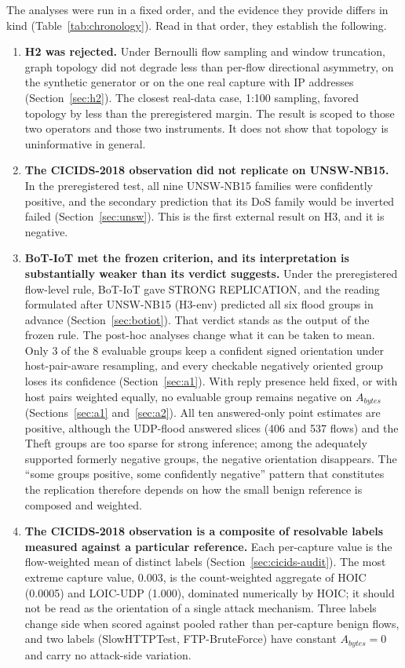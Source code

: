 \documentclass[preprint,12pt]{elsarticle}
\begin{document}
The analyses were run in a fixed order, and the evidence they provide differs in kind (Table~\ref{tab:chronology}). Read in that order, they establish the following.

\begin{enumerate}
\item \textbf{H2 was rejected.} Under Bernoulli flow sampling and window truncation, graph topology did not degrade less than per-flow directional asymmetry, on the synthetic generator or on the one real capture with IP addresses (Section~\ref{sec:h2}). The closest real-data case, 1:100 sampling, favored topology by less than the preregistered margin. The result is scoped to those two operators and those two instruments. It does not show that topology is uninformative in general.
\item \textbf{The CICIDS-2018 observation did not replicate on UNSW-NB15.} In the preregistered test, all nine UNSW-NB15 families were confidently positive, and the secondary prediction that its DoS family would be inverted failed (Section~\ref{sec:unsw}). This is the first external result on H3, and it is negative.
\item \textbf{BoT-IoT met the frozen criterion, and its interpretation is substantially weaker than its verdict suggests.} Under the preregistered flow-level rule, BoT-IoT gave STRONG REPLICATION, and the reading formulated after UNSW-NB15 (H3-env) predicted all six flood groups in advance (Section~\ref{sec:botiot}). That verdict stands as the output of the frozen rule. The post-hoc analyses change what it can be taken to mean. Only 3 of the 8 evaluable groups keep a confident signed orientation under host-pair-aware resampling, and every checkable negatively oriented group loses its confidence (Section~\ref{sec:a1}). With reply presence held fixed, or with host pairs weighted equally, no evaluable group remains negative on $A_{bytes}$ (Sections~\ref{sec:a1} and~\ref{sec:a2}). All ten answered-only point estimates are positive, although the UDP-flood answered slices (406 and 537 flows) and the Theft groups are too sparse for strong inference; among the adequately supported formerly negative groups, the negative orientation disappears. The ``some groups positive, some confidently negative'' pattern that constitutes the replication therefore depends on how the small benign reference is composed and weighted.
\item \textbf{The CICIDS-2018 observation is a composite of resolvable labels measured against a particular reference.} Each per-capture value is the flow-weighted mean of distinct labels (Section~\ref{sec:cicids-audit}). The most extreme capture value, 0.003, is the count-weighted aggregate of HOIC (0.0005) and LOIC-UDP (1.000), dominated numerically by HOIC; it should not be read as the orientation of a single attack mechanism. Three labels change side when scored against pooled rather than per-capture benign flows, and two labels (SlowHTTPTest, FTP-BruteForce) have constant $A_{bytes}=0$ and carry no attack-side variation.

\end{enumerate}
\end{document}
